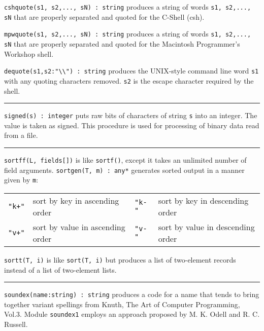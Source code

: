 \texttt{cshquote(s1, s2,..., sN) : string} produces a string of words
\texttt{s1, s2,..., sN} that are properly separated and quoted for the
C-Shell (csh).

\texttt{mpwquote(s1, s2,..., sN) : string} produces a string of words
\texttt{s1, s2,..., sN} that are properly separated and quoted for the
Macintosh Programmer's Workshop shell.

\texttt{dequote(s1,s2:"{\textbackslash}{\textbackslash}")
: string} produces the UNIX-style command line word \texttt{s1} with
any quoting characters removed. \texttt{s2} is the escape character
required by the shell.

\vspace{0.25cm}\hrule{}

\texttt{signed(s) : integer} puts raw bits of characters of string
\texttt{s} into an integer. The value is taken as signed. This
procedure is used for processing of binary data read from a file.

\vspace{0.25cm}\hrule{}

\texttt{sort}\texttt{ff(L, fields[])} is like
\texttt{sortf()}, except it takes an unlimited number of field arguments. \texttt{sortgen(T, m) : any*} generates sorted
output in a manner given by \texttt{m}:

\begin{tabular}{m{0.3in}m{2.5in}m{0.3in}m{2.7in}}
\texttt{"k+"} & sort by key in ascending order &
\texttt{"k-"} & sort by key in descending order\\
\texttt{"v+"} & sort by value in ascending order &
\texttt{"v-"} & sort by value in descending order
\end{tabular}

\texttt{sortt}\texttt{(T, i)} is like \texttt{sort(T, i)}
but produces a list of two-element records instead of a list of
two-element lists.

\vspace{0.25cm}\hrule{}

\texttt{soundex(name:string) : string} produces a code for a name that
tends to bring together variant spellings from Knuth, The Art
of Computer Programming, Vol.3.
Module \texttt{soundex1} employs an approach proposed by M. K.
Odell and R. C. Russell.

